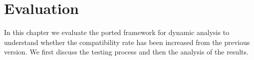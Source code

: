 \chapter{Evaluation}
\label{chap:evaluation}

In this chapter we evaluate the ported framework for dynamic analysis
to understand whether the compatibility rate has been increased from
the previous version. We first discuss the testing process and then
the analysis of the results.

